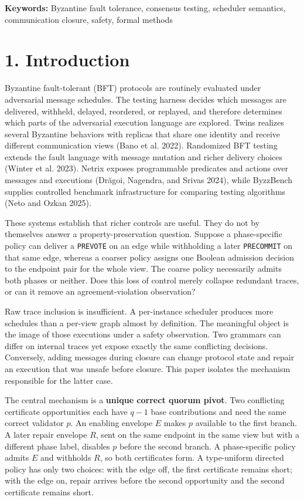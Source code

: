 \documentclass[10pt,a4paper]{article}
\begin{document}
\noindent\textbf{Keywords:} Byzantine fault tolerance, consensus
testing, scheduler semantics, communication closure, safety, formal
methods
\vspace{0.6em}

\section{1. Introduction}\label{introduction}

Byzantine fault-tolerant (BFT) protocols are routinely evaluated under
adversarial message schedules. The testing harness decides which
messages are delivered, withheld, delayed, reordered, or replayed, and
therefore determines which parts of the adversarial execution language
are explored. Twins realizes several Byzantine behaviors with replicas
that share one identity and receive different communication views (Bano
et al. 2022). Randomized BFT testing extends the fault language with
message mutation and richer delivery choices (Winter et al. 2023).
Netrix exposes programmable predicates and actions over messages and
executions (Drăgoi, Nagendra, and Srivas 2024), while ByzzBench supplies
controlled benchmark infrastructure for comparing testing algorithms
(Neto and Ozkan 2025).

These systems establish that richer controls are useful. They do not by
themselves answer a property-preservation question. Suppose a
phase-specific policy can deliver a \texttt{PREVOTE} on an edge while
withholding a later \texttt{PRECOMMIT} on that same edge, whereas a
coarser policy assigns one Boolean admission decision to the endpoint
pair for the whole view. The coarse policy necessarily admits both
phases or neither. Does this loss of control merely collapse redundant
traces, or can it remove an agreement-violation observation?

Raw trace inclusion is insufficient. A per-instance scheduler produces
more schedules than a per-view graph almost by definition. The
meaningful object is the image of those executions under a safety
observation. Two grammars can differ on internal traces yet expose
exactly the same conflicting decisions. Conversely, adding messages
during closure can change protocol state and repair an execution that
was unsafe before closure. This paper isolates the mechanism responsible
for the latter case.

The central mechanism is a \textbf{unique correct quorum pivot}. Two
conflicting certificate opportunities each have \(q-1\) base
contributions and need the same correct validator \(p\). An enabling
envelope \(E\) makes \(p\) available to the first branch. A later repair
envelope \(R\), sent on the same endpoint in the same view but with a
different phase label, disables \(p\) before the second branch. A
phase-specific policy admits \(E\) and withholds \(R\), so both
certificates form. A type-uniform directed policy has only two choices:
with the edge off, the first certificate remains short; with the edge
on, repair arrives before the second opportunity and the second
certificate remains short.
\end{document}
